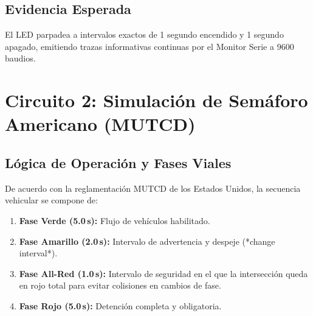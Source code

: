 \documentclass[12pt,a4paper]{article}
\begin{document}
\subsection{Evidencia Esperada}
El LED parpadea a intervalos exactos de 1 segundo encendido y 1 segundo apagado, emitiendo trazas informativas continuas por el Monitor Serie a 9600 baudios.

\section{Circuito 2: Simulación de Semáforo Americano (MUTCD)}

\subsection{Lógica de Operación y Fases Viales}
De acuerdo con la reglamentación MUTCD de los Estados Unidos, la secuencia vehicular se compone de:
\begin{enumerate}[noitemsep]
    \item \textbf{Fase Verde (5.0\,s):} Flujo de vehículos habilitado.
    \item \textbf{Fase Amarillo (2.0\,s):} Intervalo de advertencia y despeje (*change interval*).
    \item \textbf{Fase All-Red (1.0\,s):} Intervalo de seguridad en el que la intersección queda en rojo total para evitar colisiones en cambios de fase.
    \item \textbf{Fase Rojo (5.0\,s):} Detención completa y obligatoria.
\end{enumerate}
\end{document}
